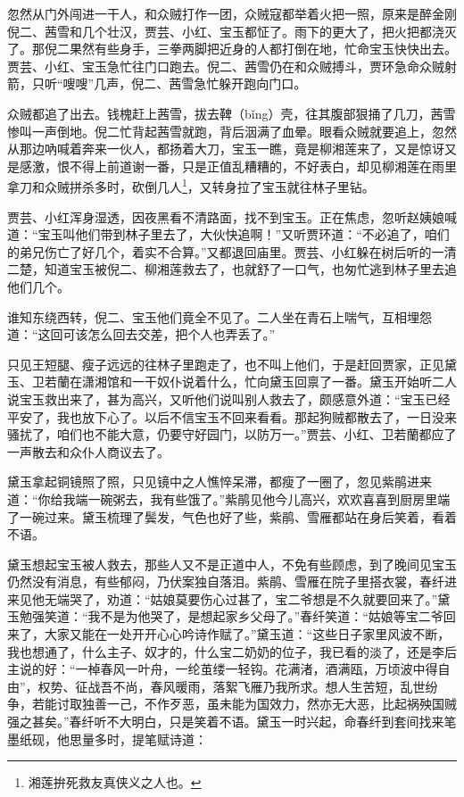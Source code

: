\documentclass[12pt,oneside]{book}
\begin{document}
忽然从门外闯进一干人，和众贼打作一团，众贼寇都举着火把一照，原来是醉金刚倪二、茜雪和几个壮汉，贾芸、小红、宝玉都怔了。雨下的更大了，把火把都浇灭了。那倪二果然有些身手，三拳两脚把近身的人都打倒在地，忙命宝玉快快出去。贾芸、小红、宝玉急忙往门口跑去。倪二、茜雪仍在和众贼搏斗，贾环急命众贼射箭，只听“嗖嗖”几声，倪二、茜雪急忙躲开跑向门口。

众贼都追了出去。钱槐赶上茜雪，拔去鞞（bǐng）壳，往其腹部狠捅了几刀，茜雪惨叫一声倒地。倪二忙背起茜雪就跑，背后洇满了血晕。眼看众贼就要追上，忽然从那边吶喊着奔来一伙人，都扬着大刀，宝玉一瞧，竟是柳湘莲来了，又是惊讶又是感激，恨不得上前道谢一番，只是正值乱糟糟的，不好表白，却见柳湘莲在雨里拿刀和众贼拼杀多时，砍倒几人\footnote{湘莲拚死救友真侠义之人也。}，又转身拉了宝玉就往林子里钻。

贾芸、小红浑身湿透，因夜黑看不清路面，找不到宝玉。正在焦虑，忽听赵姨娘喊道：“宝玉叫他们带到林子里去了，大伙快追啊！”又听贾环道：“不必追了，咱们的弟兄伤亡了好几个，着实不合算。”又都退回庙里。贾芸、小红躲在树后听的一清二楚，知道宝玉被倪二、柳湘莲救去了，也就舒了一口气，也匆忙逃到林子里去追他们几个。

谁知东绕西转，倪二、宝玉他们竟全不见了。二人坐在青石上喘气，互相埋怨道：“这回可该怎么回去交差，把个人也弄丢了。”

只见王短腿、瘦子远远的往林子里跑走了，也不叫上他们，于是赶回贾家，正见黛玉、卫若蘭在潇湘馆和一干奴仆说着什么，忙向黛玉回禀了一番。黛玉开始听二人说宝玉救出来了，甚为高兴，又听他们说叫别人救去了，颇感意外道：“宝玉已经平安了，我也放下心了。以后不信宝玉不回来看看。那起狗贼都散去了，一日没来骚扰了，咱们也不能大意，仍要守好园门，以防万一。”贾芸、小红、卫若蘭都应了一声散去和众仆人商议去了。

黛玉拿起铜镜照了照，只见镜中之人憔悴呆滞，都瘦了一圈了，忽见紫鹃进来道：“你给我端一碗粥去，我有些饿了。”紫鹃见他今儿高兴，欢欢喜喜到厨房里端了一碗过来。黛玉梳理了鬓发，气色也好了些，紫鹃、雪雁都站在身后笑着，看着不语。

黛玉想起宝玉被人救去，那些人又不是正道中人，不免有些顾虑，到了晚间见宝玉仍然没有消息，有些郁闷，乃伏案独自落泪。紫鹃、雪雁在院子里搭衣裳，春纤进来见他无端哭了，劝道：“姑娘莫要伤心过甚了，宝二爷想是不久就要回来了。”黛玉勉强笑道：“我不是为他哭了，是想起家乡父母了。”春纤笑道：“姑娘等宝二爷回来了，大家又能在一处开开心心吟诗作赋了。”黛玉道：“这些日子家里风波不断，我也想通了，什么主子、奴才的，什么宝二奶奶的位子，我已看的淡了，还是李后主说的好：“一棹春风一叶舟，一纶茧缕一轻钩。花满渚，酒满瓯，万顷波中得自由”，权势、征战吾不尚，春风暖雨，落絮飞雁乃我所求。想人生苦短，乱世纷争，若能讨取独善一己，不作歹恶，虽未能为国效力，然亦无大恶，比起祸殃国贼强之甚矣。”春纤听不大明白，只是笑着不语。黛玉一时兴起，命春纤到套间找来笔墨纸砚，他思量多时，提笔赋诗道：
\end{document}
